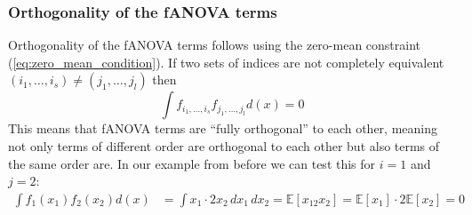 
\subsubsection*{Orthogonality of the fANOVA terms}
Orthogonality of the fANOVA terms follows using the zero-mean constraint (\autoref{eq:zero_mean_condition}). If two sets of indices are not completely equivalent $(i_1, \dots, i_s) \neq (j_1, \dots, j_l)$ then
\begin{equation}
    \int f_{i_{1}, \dots, i_{s}} f_{j_{1}, \dots, j_{l}} d(x) = 0
    \label{eq:orthogonality}
\end{equation}
This means that fANOVA terms are ``fully orthogonal'' to each other, meaning not only terms of different order are orthogonal to each other but also terms of the same order are.
In our example from before we can test this for $i = 1$ and $j = 2$:
\begin{align*}
    \int f_{1}(x_1) f_{2}(x_2) d(x) &= \int x_1 \cdot 2x_2 \, dx_1 \, dx_2 = \mathbb{E}[x_12x_2] = \mathbb{E}[x_1] \cdot 2\mathbb{E}[x_2] = 0
\end{align*}

